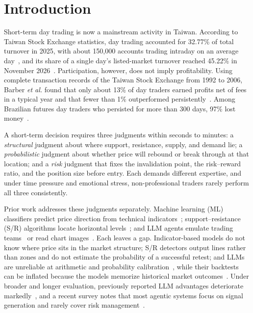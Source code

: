 \documentclass[conference]{IEEEtran}
\begin{document}
\section{Introduction}

Short-term day trading is now a mainstream activity in Taiwan. According to Taiwan Stock Exchange statistics, day trading accounted for 32.77\% of total turnover in 2025, with about 150{,}000 accounts trading intraday on an average day~\cite{yahoo2025daytrade}, and its share of a single day's listed-market turnover reached 45.22\% in November 2026~\cite{ctee2026daytrade}. Participation, however, does not imply profitability. Using complete transaction records of the Taiwan Stock Exchange from 1992 to 2006, Barber \emph{et al.} found that only about 13\% of day traders earned profits net of fees in a typical year and that fewer than 1\% outperformed persistently~\cite{barber2014speculator}. Among Brazilian futures day traders who persisted for more than 300 days, 97\% lost money~\cite{chague2019daytrading}.

A short-term decision requires three judgments within seconds to minutes: a \emph{structural} judgment about where support, resistance, supply, and demand lie; a \emph{probabilistic} judgment about whether price will rebound or break through at that location; and a \emph{risk} judgment that fixes the invalidation point, the risk--reward ratio, and the position size before entry. Each demands different expertise, and under time pressure and emotional stress, non-professional traders rarely perform all three consistently.

Prior work addresses these judgments separately. Machine learning (ML) classifiers predict price direction from technical indicators~\cite{soltanisehat2025multimodel}; support--resistance (S/R) algorithms locate horizontal levels~\cite{chan2022support,kriuk2025deepsupp}; and LLM agents emulate trading teams~\cite{xiao2024tradingagents} or read chart images~\cite{chen2025mmdrex}. Each leaves a gap. Indicator-based models do not know where price sits in the market structure; S/R detectors output lines rather than zones and do not estimate the probability of a successful retest; and LLMs are unreliable at arithmetic and probability calibration~\cite{kuang2025hybrid}, while their backtests can be inflated because the models memorize historical market outcomes~\cite{lopezlira2025memorization,gao2025lookahead,li2025profitmirage}. Under broader and longer evaluation, previously reported LLM advantages deteriorate markedly~\cite{li2025finsaber}, and a recent survey notes that most agentic systems focus on signal generation and rarely cover risk management~\cite{hua2026agentic}.
\end{document}
